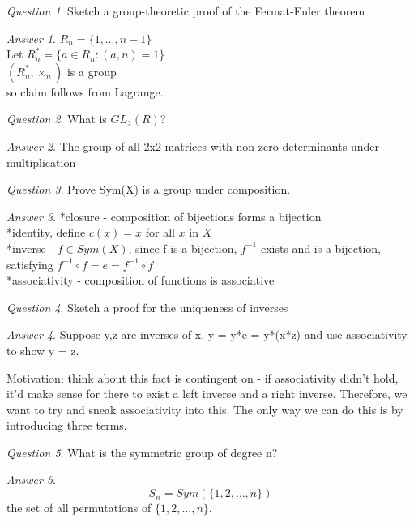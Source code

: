 \documentclass[]{article}
\theoremstyle{remark}
\theoremstyle{qnstyle}
\newtheorem{question}{Question}
\theoremstyle{answerstyle}
\newtheorem*{answer}{Answer}
\begin{document}
{
    \begin{question}
        Sketch a group-theoretic proof of the Fermat-Euler theorem
    \end{question}
    \begin{answer}
        $R_n = \{1, \ldots, n-1\}$ \\
        Let $R^*_n = \{a \in R_n: (a,n) = 1\}$ \\
        $(R^*_n, \times_n)$ is a group\\

        so claim follows from Lagrange.
    \end{answer}
}
{
    \begin{question}
        What is $GL_2(R)$?
    \end{question}
    \begin{answer}
        The group of all 2x2 matrices with non-zero determinants under multiplication
    \end{answer}
}
{
    \begin{question}
        Prove Sym(X) is a group under composition.
    \end{question}
    \begin{answer}
        *closure - composition of bijections forms a bijection \\ 
        *identity, define $c(x) = x$ for all $x$ in $X$ \\
        *inverse - $f \in Sym(X)$, since f is a bijection, $f^{-1}$ exists and is a bijection, satisfying $f^{-1} \circ f = e = f^{-1} \circ f$ \\
        *associativity - composition of functions is associative
    \end{answer}
}
{
    \begin{question}
        Sketch a proof for the uniqueness of inverses
    \end{question}
    \begin{answer}
        Suppose y,z are inverses of x. y = y*e = y*(x*z) and use associativity to show y = z. 

        Motivation: think about this fact is contingent on 
        - if associativity didn't hold, it'd make sense for there to exist 
        a left inverse and a right inverse. Therefore, we want to try and 
        sneak associativity into this. The only way we can do this is by 
        introducing three terms.
    \end{answer}
}
{
    \begin{question}
        What is the symmetric group of degree n?
    \end{question}
    \begin{answer}
        $$S_n = Sym(\{1, 2, \ldots, n \})$$
        the set of all permutations of $\{1, 2, \ldots, n\}$.
    \end{answer}
}
\end{document}
